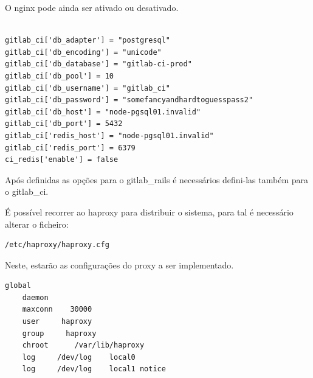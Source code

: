 \documentclass[12pt,a4paper]{article}
\begin{document}
O nginx pode ainda ser ativado ou desativado.

\begin{verbatim}

gitlab_ci['db_adapter'] = "postgresql"  
gitlab_ci['db_encoding'] = "unicode"  
gitlab_ci['db_database'] = "gitlab-ci-prod"  
gitlab_ci['db_pool'] = 10  
gitlab_ci['db_username'] = "gitlab_ci"  
gitlab_ci['db_password'] = "somefancyandhardtoguesspass2"  
gitlab_ci['db_host'] = "node-pgsql01.invalid"  
gitlab_ci['db_port'] = 5432  
gitlab_ci['redis_host'] = "node-pgsql01.invalid"  
gitlab_ci['redis_port'] = 6379  
ci_redis['enable'] = false 
\end{verbatim}

Após definidas as opções para o gitlab\_rails é necessários defini-las também para o gitlab\_ci.


É possível recorrer ao haproxy para distribuir o sistema, para tal é necessário alterar o ficheiro:
\begin{verbatim}
/etc/haproxy/haproxy.cfg
\end{verbatim}

Neste, estarão as configurações do proxy a ser implementado.

\begin{verbatim}
global  
    daemon
    maxconn    30000
    user     haproxy
    group     haproxy
    chroot      /var/lib/haproxy
    log     /dev/log    local0
    log     /dev/log    local1 notice

\end{verbatim}
\end{document}
